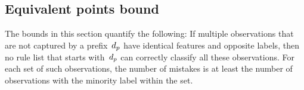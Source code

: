 \begin{arxiv}
\begin{comment}
Suppose prefixes~$\cal P$ and~$\cal Q$ capture the same data,
and now derive~$\cal P'$ from~$\cal P$ by appending antecedent~$p$
and derive~$\cal Q'$ from~$\cal Q$ by appending antecedent~$q$.
%
Suppose further that~$p$ and~$q$ capture nearly the same data, except that
they exclusively capture data~$x_p$ and~$x_q$ in their respective contexts,
such that the normalized support of~$x_p$ and of~$x_q$ are each bounded by
the regularization parameter: ${s(x_p), s(x_q) < c}$.
%
Our minimum support bound~\eqref{eq:min-capture} implies
that~$p$ would never be placed below~$\cal Q'$ nor~$q$ below~$\cal P'$.

Extensions of~$\cal P'$ and~$\cal Q'$ will behave similarly.
%
The largest difference would occur if a rule list starting with~$\cal P'$
misclassified all of~$x_p$ and~$x_q$, while the analogous rule list starting
with~$\cal Q'$ correctly classified all these data, or vice versa,
yielding a difference between objectives bounded by~$2c$.
%
Let~$\cal P^*$ and~$\cal Q^*$ be the optimal prefixes
starting with~$\cal P'$ and~$\cal Q'$, respectively.
%
Note that~$\cal P^*$ and~$\cal Q^*$ need not be derived from~$\cal P'$ and~$\cal Q'$
via analogous extensions.
%
If we know~$\cal P^*$, then we can avoid evaluating \emph{any} extensions of~$\cal Q'$ if
\begin{align}
\Obj(\Prefix^*) - 2 c \ge \Obj^*,
\end{align}
where~$\Obj^*$ is the best known objective, since the left had expression
provides a lower bound on~$\Obj(\cal{Q}^*)$.
\end{comment}

\end{arxiv}

\subsection{Equivalent points bound}
\label{sec:identical}

The bounds in this section quantify the following:
%
If multiple observations that are not captured by a prefix~$d_p$
have identical features and opposite labels, then no rule list that
starts with~$d_p$ can correctly classify all these observations.
%
For each set of such observations, the number of mistakes is at least
the number of observations with the minority label within the set.

